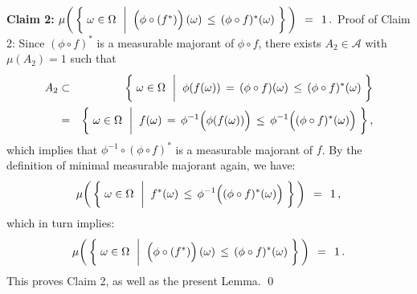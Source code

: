 \vskip 0.5cm
\noindent
\textbf{Claim 2:}\quad
$\mu\!\left(\,\left\{\;
	\omega \in \Omega
	\,\;\left\vert\;\;
	\left(\overset{{\color{white}.}}{\phi} \circ (f^{*})\right)(\omega)
		\,\overset{{\color{white}\vert}}{\leq}\,
		(\phi \circ f)^{*}(\omega)
	\right.
\,\right\}\,\right)
\,\;=\;\, 1\,.
$
\vskip 0.2cm
\noindent
Proof of Claim 2:\;\;
Since $(\phi \circ f)^{*}$ is a measurable majorant of $\phi \circ f$,
there exists $A_{2} \in \mathcal{A}$ with $\mu(A_{2}) = 1$ such that
\begin{eqnarray*}
A_{2}
&\subset&
	\left\{\;
		\omega \in \Omega
		\,\;\left\vert\;\;
		\phi(f(\omega)) \,=\, (\phi \circ f)(\omega) \,\overset{{\color{white}\vert}}{\leq}\, (\phi \circ f)^{*}(\omega)
	\right.
	\,\right\}
\\
& = &
	\left\{\;
		\omega \in \Omega
		\,\;\left\vert\;\;
		f(\omega)
			\,=\,
				\phi^{-1}\!\left(\overset{{\color{white}.}}{\phi}(f(\omega))\right)
			\,\overset{{\color{white}\vert}}{\leq}\,
				\phi^{-1}\!\left((\overset{{\color{white}.}}{\phi} \circ f)^{*}(\omega)\right)
	\right.
	\,\right\},
\end{eqnarray*}
which implies that $\phi^{-1} \circ (\phi \circ f)^{*}$ is a measurable majorant of $f$.
By the definition of minimal measurable majorant again, we have:
\begin{equation*}
\mu\!\left(\,\left\{\;
	\omega \in \Omega
	\,\;\left\vert\;\;
	f^{*}(\omega) \,\overset{{\color{white}\vert}}{\leq}\, \phi^{-1}\!\left((\overset{{\color{white}.}}{\phi} \circ f)^{*}(\omega)\right)
	\right.
\,\right\}\,\right)
\,\;=\;\, 1\,,
\end{equation*}
which in turn implies:
\begin{equation*}
\mu\!\left(\,\left\{\;
	\omega \in \Omega
	\,\;\left\vert\;\;
	\left(\overset{{\color{white}.}}{\phi} \circ (f^{*})\right)(\omega)
		\,\overset{{\color{white}\vert}}{\leq}\,
		(\phi \circ f)^{*}(\omega)
	\right.
\,\right\}\,\right)
\,\;=\;\, 1\,.
\end{equation*}
This proves Claim 2, as well as the present Lemma.
\qed


\renewcommand{\theenumi}{\roman{enumi}}
\renewcommand{\labelenumi}{\textnormal{(\theenumi)}$\;\;$}

